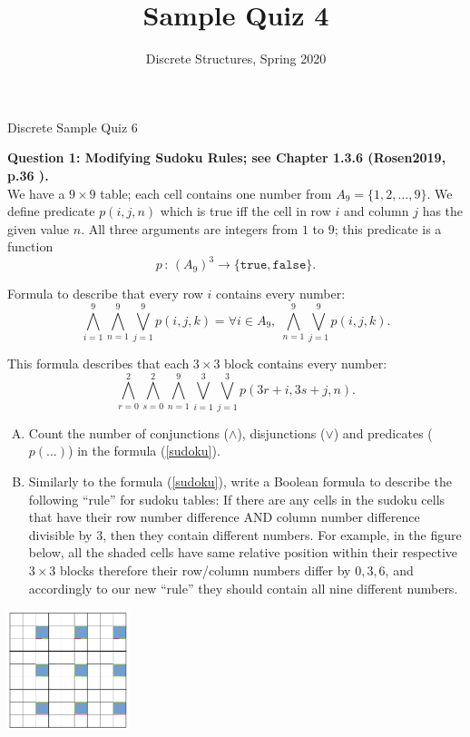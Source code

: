 \documentclass[jou]{apa6}
\title{Sample Quiz 4}
\author{Discrete Structures, Spring 2020}
\affiliation{RBS}
\begin{document}
\thispagestyle{empty}

\twocolumn
{\Large Discrete Sample Quiz 6}

\vspace{10pt}
{\bf Question 1: Modifying Sudoku Rules; see Chapter 1.3.6 
(Rosen2019, p.36 ).}\\ 
We have a $9 \times 9$ table; each cell contains one number from 
$A_9 = \{ 1, 2,\ldots, 9 \}$. We define predicate $p(i,j,n)$ which 
is true iff the cell in row $i$ and column $j$ has the given value $n$.
All three arguments are integers from $1$ to $9$; this predicate is a function 
$$p \,:\, \left( A_9 \right) ^3 \rightarrow \{ \mathtt{true}, \mathtt{false} \}.$$

Formula to describe that every row $i$ contains every number: 
$$\bigwedge\limits_{i=1}^{9} \bigwedge\limits_{n=1}^{9} \bigvee_{j=1}^{9} p(i,j,k) = 
\forall i \in A_9,\;\bigwedge\limits_{n=1}^{9} \bigvee_{j=1}^{9} p(i,j,k).$$

This formula describes that each $3 \times 3$ block contains every number:
\begin{equation} 
\label{sudoku}
\bigwedge\limits_{r = 0}^{2} \bigwedge\limits_{s = 0}^{2} \bigwedge\limits_{n = 1}^{9}
\bigvee\limits_{i = 1}^{3} \bigvee\limits_{j = 1}^{3} p(3r+i, 3s+j, n).
\end{equation}

\begin{enumerate}[(A)]
\item Count the number of conjunctions ($\wedge$), disjunctions ($\vee$) and 
predicates ($p(\ldots)$) in the formula (\ref{sudoku}).
\item Similarly to the formula (\ref{sudoku}), write a Boolean formula 
to describe the following ``rule'' for sudoku tables: 
If there are any cells in the sudoku cells that have their row number difference AND column 
number difference divisible by $3$, then they contain different numbers.
For example, in the figure below, all the shaded cells have same relative position within their
respective $3 \times 3$ blocks \textendash{} therefore their row/column numbers differ by 
$0,3,6$, and accordingly to our new ``rule'' they should contain all nine different numbers. 
\end{enumerate}
 
\begin{center}
\includegraphics[width=1.4in]{sudoku.png}
\end{center}
\end{document}

